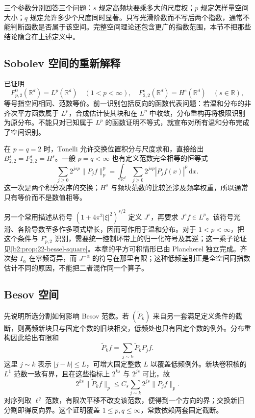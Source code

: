 \ProseParagraphBreak

三个参数分别回答三个问题：\(s\) 规定高频块要乘多大的尺度权；\(p\) 规定怎样量空间大小；\(q\) 规定允许多少个尺度同时显著。只写光滑阶数而不写后两个指数，通常不能判断函数是否属于该空间。完整空间理论还包含更广的指数范围，本节不把那些结论隐含在上述定义中。

\subsection{Sobolev 空间的重新解释}
\label{b2:subsec:190502}

已证明
\[
 F^0_{p,2}(\mathbb R^d)=L^p(\mathbb R^d)
 \quad(1<p<\infty),
 \quad F^s_{2,2}(\mathbb R^d)=H^s(\mathbb R^d)
 \quad(s\in\mathbb R),
\]
等号指空间相同、范数等价。前一识别包括反向的函数代表问题：若温和分布的非齐次平方函数属于 \(L^p\)，合成估计使其块和在 \(L^p\) 中收敛，分布重构再将极限识别为原分布。不能只对已知属于 \(L^p\) 的函数证明不等式，就宣布对所有温和分布完成了空间识别。

\ProseParagraphBreak

在 \(p=q=2\) 时，Tonelli 允许交换位置积分与尺度求和，直接给出 \(B^s_{2,2}=F^s_{2,2}=H^s\)。一般 \(p=q<\infty\) 也有定义范数完全相等的恒等式
\[
 \sum_{j\geq0}2^{jsp}\|P_jf\|_p^p
 =\int_{\mathbb R^d}\sum_{j\geq0}2^{jsp}|P_jf(x)|^p\,\mathrm dx.
\]
这一次是两个积分次序的交换；\(H^s\) 与频块范数的比较还涉及频率权重，所以通常只有等价而不是数值相等。

\ProseParagraphBreak

另一个常用描述从符号 \((1+4\pi^2|\xi|^2)^{s/2}\) 定义 \(J^s\)，再要求 \(J^sf\in L^p\)。该符号光滑、各阶导数至多作多项式增长，因而可作用于温和分布。对于 \(1<p<\infty\)，把这个条件与 \(F^s_{p,2}\) 识别，需要统一控制环带上的归一化符号及其逆；这一乘子论证见\cref{b2:prop:22-bessel-square}。本章的平方可积情形已由 Plancherel 独立完成。齐次势 \(I_\alpha\) 在零频奇异，而 \(J^{-\alpha}\) 的符号在那里有限；这种低频差别正是全空间同指数估计不同的原因，不能把二者混作同一个算子。

\subsection{Besov 空间}
\label{b2:subsec:190503}

先说明所选分割如何影响 Besov 范数。若 \((\widetilde P_k)\) 来自另一套满足定义条件的截断，则高频新块只与固定个数的旧块相交，低频处也只有固定个数的例外。分布重构因此给出有限和
\[
 \widetilde P_kf=\sum_{j\sim k}\widetilde P_kP_jf.
\]
这里 \(j\sim k\) 表示 \(|j-k|\leq L\)，可增大固定整数 \(L\) 以覆盖低频例外。新块卷积核的 \(L^1\) 范数一致有界，且在这些指标上 \(2^{ks}\) 与 \(2^{js}\) 可比，故
\[
 2^{ks}\|\widetilde P_kf\|_p
 \leq C_s\sum_{j\sim k}2^{js}\|P_jf\|_p.
\]
对序列取 \(\ell^q\) 范数，有限次平移不改变该范数，便得到一个方向的界；交换新旧分割即得反向界。这个证明覆盖 \(1\leq p,q\leq\infty\)，常数依赖两套固定截断。

